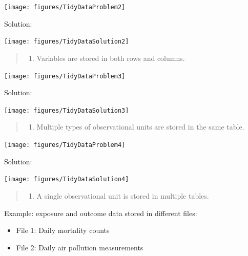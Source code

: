 \documentclass[]{book}
\providecommand{\tightlist}{%
  \setlength{\itemsep}{0pt}\setlength{\parskip}{0pt}}
\theoremstyle{definition}
\theoremstyle{definition}
\theoremstyle{definition}
\theoremstyle{remark}
\begin{document}
\begin{center}\texttt{[image: figures/TidyDataProblem2]} \end{center}

Solution:

\begin{center}\texttt{[image: figures/TidyDataSolution2]} \end{center}

\begin{quote}
\begin{enumerate}
\def\labelenumi{\arabic{enumi}.}
\setcounter{enumi}{2}
\tightlist
\item
  Variables are stored in both rows and columns.
\end{enumerate}
\end{quote}

\texttt{[image: figures/TidyDataProblem3]}

Solution:

\texttt{[image: figures/TidyDataSolution3]}

\begin{quote}
\begin{enumerate}
\def\labelenumi{\arabic{enumi}.}
\setcounter{enumi}{3}
\tightlist
\item
  Multiple types of observational units are stored in the same table.
\end{enumerate}
\end{quote}

\texttt{[image: figures/TidyDataProblem4]}

Solution:

\texttt{[image: figures/TidyDataSolution4]}

\begin{quote}
\begin{enumerate}
\def\labelenumi{\arabic{enumi}.}
\setcounter{enumi}{4}
\tightlist
\item
  A single observational unit is stored in multiple tables.
\end{enumerate}
\end{quote}

Example: exposure and outcome data stored in different files:

\begin{itemize}
\tightlist
\item
  File 1: Daily mortality counts
\item
  File 2: Daily air pollution measurements
\end{itemize}
\end{document}
